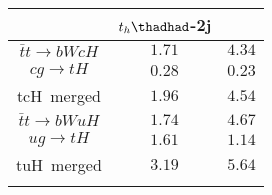 \centering
\begin{tabular}{ccc} \toprule\toprule
 & $t_{h}\thadhad$-2j\\\midrule
$\bar{t}t\to bWcH$ &         $1.71$ & $4.34$  \\
$cg\to tH$ &                 $0.28$ & $0.23$ \\
tcH~merged &                 $1.96$ & $4.54$ \\
$\bar{t}t\to bWuH$ &         $1.74$ & $4.67$ \\
$ug\to tH$ &                 $1.61$ & $1.14$  \\
tuH~merged &                 $3.19$ & $5.64$  \\
\bottomrule\bottomrule\\
\end{tabular}